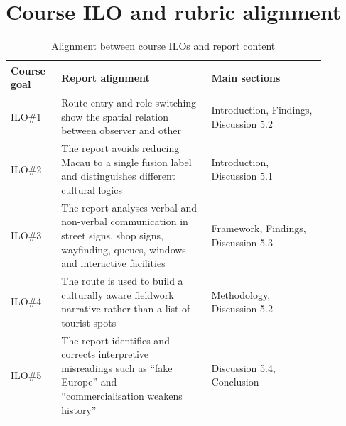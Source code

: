 \documentclass[12pt,a4paper]{article}
\begin{document}
\section{Course ILO and rubric alignment}

\begin{table}[H]
\small
\centering
\caption{Alignment between course ILOs and report content}
\begin{tabular}{>{\raggedright\arraybackslash}p{0.14\linewidth}>{\raggedright\arraybackslash}p{0.42\linewidth}>{\raggedright\arraybackslash}p{0.32\linewidth}}
\toprule
Course goal & Report alignment & Main sections \\
\midrule
ILO\#1 & Route entry and role switching show the spatial relation between observer and other & Introduction, Findings, Discussion 5.2 \\
ILO\#2 & The report avoids reducing Macau to a single fusion label and distinguishes different cultural logics & Introduction, Discussion 5.1 \\
ILO\#3 & The report analyses verbal and non-verbal communication in street signs, shop signs, wayfinding, queues, windows and interactive facilities & Framework, Findings, Discussion 5.3 \\
ILO\#4 & The route is used to build a culturally aware fieldwork narrative rather than a list of tourist spots & Methodology, Discussion 5.2 \\
ILO\#5 & The report identifies and corrects interpretive misreadings such as ``fake Europe'' and ``commercialisation weakens history'' & Discussion 5.4, Conclusion \\
\bottomrule
\end{tabular}
\end{table}
\end{document}
